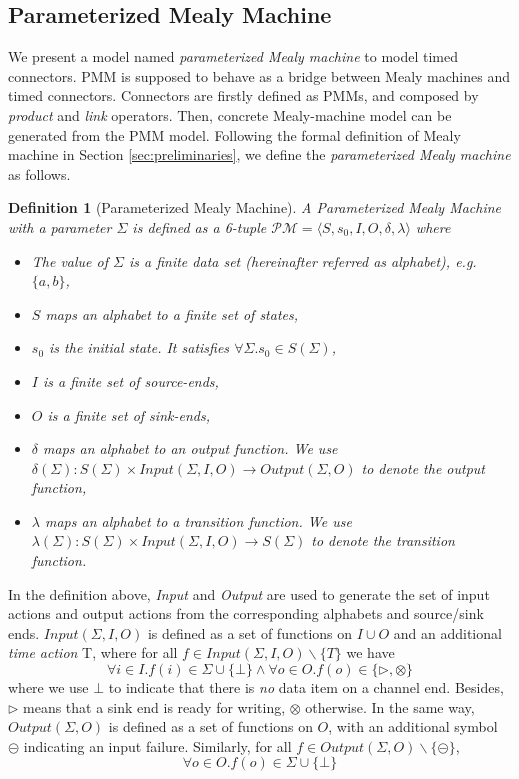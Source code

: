 \documentclass[conference, a4paper]{IEEEtran}
\newtheorem{definition}{Definition}
\newcommand{\rblock}[0]{\circleddash}
\newcommand{\rread}[0]{\rhd}
\newcommand{\rnoread}[0]{\otimes}
\begin{document}

\subsection{Parameterized Mealy Machine}
We present a model named \emph{parameterized Mealy machine} to model timed connectors. PMM is
supposed to behave as a bridge between Mealy machines and timed connectors. Connectors are firstly
defined as PMMs, and composed by \emph{product} and \emph{link} operators. Then, concrete
Mealy-machine model can be generated from the PMM model.
Following the formal definition of Mealy machine in Section \ref{sec:preliminaries}, we define the
\emph{parameterized Mealy machine} as follows. 

\begin{definition}[Parameterized Mealy Machine]
  A \emph{Parameterized Mealy Machine} with a parameter $\Sigma$ is defined as a 6-tuple
  $\mathcal{PM}=\langle S, s_0, I, O, \delta, \lambda\rangle$ where 
  \begin{itemize}
    \item[-] The value of $\Sigma$ is a \emph{finite} data set (hereinafter referred as
      alphabet), e.g.  $\{a,b\}$,
    \item[-] $S$ maps an alphabet to a \emph{finite} set of states,
    \item[-] $s_0$ is the initial state. It satisfies $\forall \Sigma.s_0\in S(\Sigma)$,
    \item[-] $I$ is a finite set of source-ends,
    \item[-] $O$ is a finite set of sink-ends,
    \item[-] $\delta$ maps an alphabet to an \emph{output function}. We use
      $\delta(\Sigma):S(\Sigma)\times Input(\Sigma,I,O)\rightarrow Output(\Sigma,O)$ to denote the
      output function,
    \item[-] $\lambda$ maps an alphabet to a \emph{transition function}. We use
      $\lambda(\Sigma):S(\Sigma)\times Input(\Sigma,I,O)\rightarrow S(\Sigma)$ to denote the
      transition function.
  \end{itemize}
\end{definition}

In the definition above, \emph{Input} and \emph{Output} are used to generate the set of input actions
and output actions from the corresponding alphabets and source/sink ends. $Input(\Sigma,I,O)$ is
defined as a set of functions on $I\cup O$ and an additional \emph{time action} T,  
where for all $f\in Input(\Sigma,I,O)\backslash \{T\}$ we have
\[
\forall i\in I.f(i)\in \Sigma\cup\{\bot\}\land \forall o\in O.f(o)\in\{\rread, \rnoread\}
\]
where we use $\bot$ to indicate that there is \emph{no} data item on a channel end. 
Besides, $\rread$ means that a sink end is ready for writing, $\rnoread$ otherwise. 
In the same way,
$Output(\Sigma,O)$ is defined as a set of functions on $O$, with an additional symbol
$\rblock$ indicating an input failure. Similarly, for all $f\in
Output(\Sigma,O)\backslash\{\rblock\}$,
\[
\forall o\in O. f(o)\in \Sigma\cup\{\bot\}
\]
\end{document}
